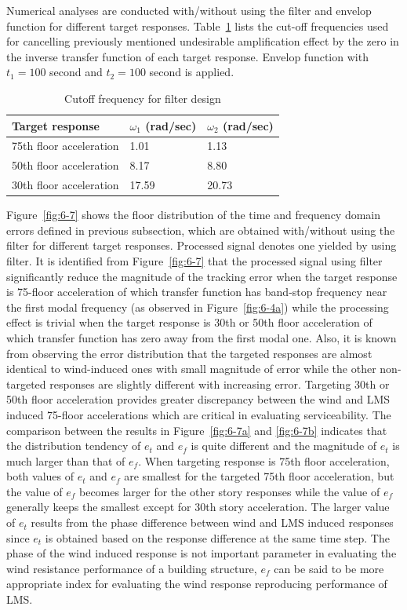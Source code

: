 Numerical analyses are conducted with/without using the filter and envelop function for different target responses. Table~\ref{tab:6-1} lists the cut-off frequencies used for cancelling previously mentioned undesirable amplification effect by the zero in the inverse transfer function of each target response. Envelop function with $t_{1}=100$ second and $t_{2}=100$ second is applied.

\begin{table}[ht]
\centering
\begin{tabularx}{\textwidth}{@{}X|X|X@{}}
\toprule[1pt]\midrule[0.3pt]
Target response & $\omega_{1}$ (rad/sec) & $\omega_{2}$ (rad/sec)\\ \hline
75th floor acceleration & 1.01 & 1.13\\
50th floor acceleration & 8.17 & 8.80\\
30th floor acceleration & 17.59 & 20.73\\
\bottomrule
\end{tabularx}
\caption{Cutoff frequency for filter design}
\label{tab:6-1}
\end{table}

Figure~\ref{fig:6-7} shows the floor distribution of the time and frequency domain errors defined in previous subsection, which are obtained with/without using the filter for different target responses. Processed signal denotes one yielded by using filter. It is identified from Figure~\ref{fig:6-7} that the processed signal using filter significantly reduce the magnitude of the tracking error when the target response is 75-floor acceleration of which transfer function has band-stop frequency near the first modal frequency (as observed in Figure~\ref{fig:6-4a}) while the processing effect is trivial when the target response is 30th or 50th floor acceleration of which transfer function has zero away from the first modal one. Also, it is known from observing the error distribution that the targeted responses are almost identical to wind-induced ones with small magnitude of error while the other non-targeted responses are slightly different with increasing error. Targeting 30th or 50th floor acceleration provides greater discrepancy between the wind and LMS induced 75-floor accelerations which are critical in evaluating serviceability.
The comparison between the results in Figure~\ref{fig:6-7a} and \ref{fig:6-7b} indicates that the distribution tendency of $e_{t}$ and $e_{f}$ is quite different and the magnitude of $e_{t}$ is much larger than that of $e_{f}$. When targeting response is 75th floor acceleration, both values of $e_{t}$ and $e_{f}$ are smallest for the targeted 75th floor acceleration, but the value of $e_{f}$ becomes larger for the other story responses while the value of $e_{f}$ generally keeps the smallest except for 30th story acceleration. The larger value of $e_{t}$ results from the phase difference between wind and LMS induced responses since $e_{t}$ is obtained based on the response difference at the same time step. The phase of the wind induced response is not important parameter in evaluating the wind resistance performance of a building structure, $e_{f}$ can be said to be more appropriate index for evaluating the wind response reproducing performance of LMS.

